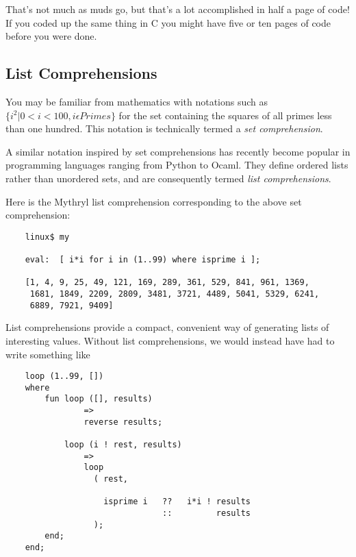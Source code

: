 That's not much as muds go, but that's a lot accomplished in half a 
page of code!  If you coded up the same thing in C you might have 
five or ten pages of code before you were done.

\cutend*


\subsection{List Comprehensions}
\label{section:tut:delving-deeper:list-comprehensions}

You may be familiar from mathematics with notations such as 
$\{ i^{2} | 0 < i < 100, i \epsilon Primes \}$ for the set 
containing the squares of all primes less than one hundred. 
This notation is technically termed a {\it set comprehension}. 

A similar notation inspired by set comprehensions has recently 
become popular in programming languages ranging from Python to 
Ocaml.  They define ordered lists rather than unordered sets, 
and are consequently termed {\it list comprehensions}.

Here is the Mythryl list comprehension corresponding to the 
above set comprehension:

\begin{verbatim}
    linux$ my

    eval:  [ i*i for i in (1..99) where isprime i ];

    [1, 4, 9, 25, 49, 121, 169, 289, 361, 529, 841, 961, 1369, 
     1681, 1849, 2209, 2809, 3481, 3721, 4489, 5041, 5329, 6241, 
     6889, 7921, 9409]

\end{verbatim}

List comprehensions provide a compact, convenient way of generating 
lists of interesting values.  Without list comprehensions, we would 
instead have had to write something like

\begin{verbatim}
    loop (1..99, [])
    where
        fun loop ([], results)
                =>
                reverse results;

            loop (i ! rest, results)
                =>
                loop
                  ( rest,

                    isprime i   ??   i*i ! results
                                ::         results
                  );
        end;                
    end;                
\end{verbatim}

